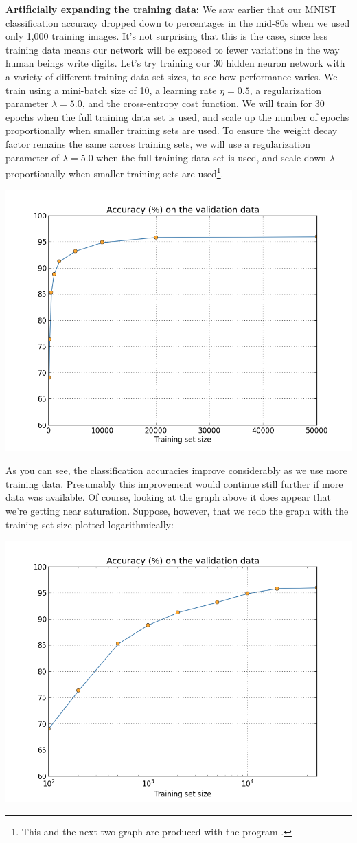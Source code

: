 \documentclass[a4paper,twoside,10pt]{book}
\begin{document}
\textbf{Artificially expanding the training data:} We saw earlier that our MNIST classification accuracy dropped down to percentages in the mid-80s when we used only 1,000 training images. It's not surprising that this is the case, since less training data means our network will be exposed to fewer variations in the way human beings write digits. Let's try training our 30 hidden neuron network with a variety of different training data set sizes, to see how performance varies. We train using a mini-batch size of 10, a learning rate $\eta=0.5$, a regularization parameter $\lambda=5.0$, and the cross-entropy cost function. We will train for 30 epochs when the full training data set is used, and scale up the number of epochs proportionally when smaller training sets are used. To ensure the weight decay factor remains the same across training sets, we will use a regularization parameter of $\lambda=5.0$ when the full training data set is used, and scale down $\lambda$ proportionally when smaller training sets are used\footnote{This and the next two graph are produced with the program .}.
\begin{center}
	\includegraphics[width=0.7\linewidth]{figures/ch3/more_data}
\end{center}
As you can see, the classification accuracies improve considerably as we use more training data. Presumably this improvement would continue still further if more data was available. Of course, looking at the graph above it does appear that we're getting near saturation. Suppose, however, that we redo the graph with the training set size plotted logarithmically:
\begin{center}
	\includegraphics[width=0.7\linewidth]{figures/ch3/more_data_log}
\end{center}
\end{document}
